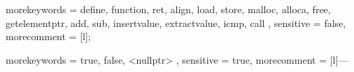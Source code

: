 
\graphicspath{{fig/}}

\usepackage{multicol}

\usepackage{listings}
\usepackage{syntax}
\usepackage{algorithm}
\usepackage{algpseudocode}

\usepackage{mdwlist}
\usepackage{tablefootnote}

\usepackage{todonotes}


{
  morekeywords = {
    define, function, ret, align,
    load, store, malloc, alloca, free, getelementptr,
    add, sub, insertvalue, extractvalue, icmp, call
  },
  sensitive    = false,
  morecomment  = [l]{;}
}

{
  morekeywords = {
    true, false, <nullptr>
  },
  sensitive    = true,
  morecomment  = [l]{---}
}



